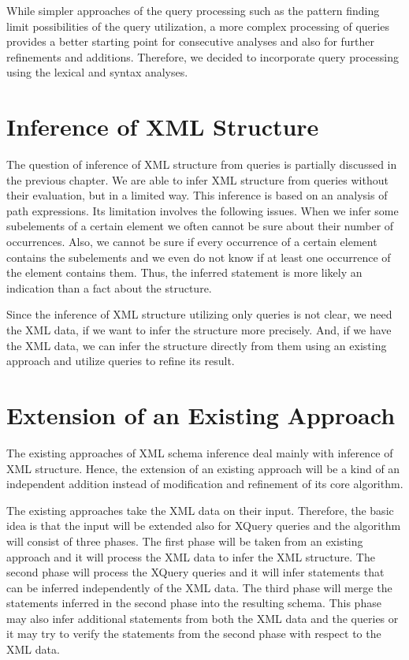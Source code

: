 While simpler approaches of the query processing such as the pattern finding limit possibilities of the query utilization, a more complex processing of queries provides a better starting point for consecutive analyses and also for further refinements and additions. Therefore, we decided to incorporate query processing using the lexical and syntax analyses.

\section{Inference of XML Structure}
The question of inference of XML structure from queries is partially discussed in the previous chapter. We are able to infer XML structure from queries without their evaluation, but in a limited way. This inference is based on an analysis of path expressions. Its limitation involves the following issues. When we infer some subelements of a certain element we often cannot be sure about their number of occurrences. Also, we cannot be sure if every occurrence of a certain element contains the subelements and we even do not know if at least one occurrence of the element contains them. Thus, the inferred statement is more likely an indication than a fact about the structure.

Since the inference of XML structure utilizing only queries is not clear, we need the XML data, if we want to infer the structure more precisely. And, if we have the XML data, we can infer the structure directly from them using an existing approach and utilize queries to refine its result.

\section{Extension of an Existing Approach}
The existing approaches of XML schema inference deal mainly with inference of XML structure. Hence, the extension of an existing approach will be a kind of an independent addition instead of modification and refinement of its core algorithm.

The existing approaches take the XML data on their input. Therefore, the basic idea is that the input will be extended also for XQuery queries and the algorithm will consist of three phases. The first phase will be taken from an existing approach and it will process the XML data to infer the XML structure. The second phase will process the XQuery queries and it will infer statements that can be inferred independently of the XML data. The third phase will merge the statements inferred in the second phase into the resulting schema. This phase may also infer additional statements from both the XML data and the queries or it may try to verify the statements from the second phase with respect to the XML data.

